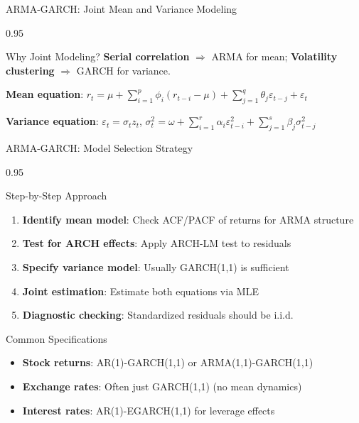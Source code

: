 \documentclass[9pt, aspectratio=169, t]{beamer}
\begin{document}
\begin{frame}{ARMA-GARCH: Joint Mean and Variance Modeling}
    \begin{cminipage}{0.95\textwidth}
\small
    \begin{block}{Why Joint Modeling?}
        \textbf{Serial correlation} $\Rightarrow$ ARMA for mean; \textbf{Volatility clustering} $\Rightarrow$ GARCH for variance.
    \end{block}
    \vspace{-0.1cm}
    \begin{defn}
        \textbf{Mean equation}: $r_t = \mu + \sum_{i=1}^{p} \phi_i (r_{t-i} - \mu) + \sum_{j=1}^{q} \theta_j \varepsilon_{t-j} + \varepsilon_t$

        \textbf{Variance equation}: $\varepsilon_t = \sigma_t z_t$, \quad $\sigma_t^2 = \omega + \sum_{i=1}^{r} \alpha_i \varepsilon_{t-i}^2 + \sum_{j=1}^{s} \beta_j \sigma_{t-j}^2$
    \end{defn}
    \end{cminipage}
\end{frame}

\begin{frame}{ARMA-GARCH: Model Selection Strategy}
    \begin{cminipage}{0.95\textwidth}
    \small
    \begin{block}{Step-by-Step Approach}
        \begin{enumerate}\setlength{\itemsep}{0pt}
            \item \textbf{Identify mean model}: Check ACF/PACF of returns for ARMA structure
            \item \textbf{Test for ARCH effects}: Apply ARCH-LM test to residuals
            \item \textbf{Specify variance model}: Usually GARCH(1,1) is sufficient
            \item \textbf{Joint estimation}: Estimate both equations via MLE
            \item \textbf{Diagnostic checking}: Standardized residuals should be i.i.d.
        \end{enumerate}
    \end{block}

    \vspace{0.2cm}

    \begin{alertblock}{Common Specifications}
        \begin{itemize}\setlength{\itemsep}{0pt}
            \item \textbf{Stock returns}: AR(1)-GARCH(1,1) or ARMA(1,1)-GARCH(1,1)
            \item \textbf{Exchange rates}: Often just GARCH(1,1) (no mean dynamics)
            \item \textbf{Interest rates}: AR(1)-EGARCH(1,1) for leverage effects
        \end{itemize}
    \end{alertblock}
    \end{cminipage}
\end{frame}
\end{document}
